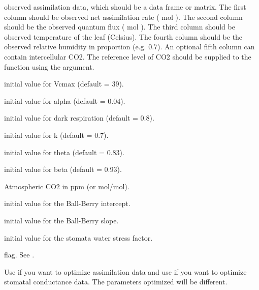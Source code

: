\documentclass[letterpaper]{book}
\begin{document}
%
\begin{Arguments}
\begin{ldescription}
\item[\code{data}] observed assimilation data, which should be a
data frame or matrix.  The first column should be
observed net assimilation rate (\eqn{\mu}{} mol
 ).  The second column should be
the observed quantum flux (\eqn{\mu}{} mol 
).  The third column should be observed
temperature of the leaf (Celsius).  The fourth column
should be the observed relative humidity in proportion
(e.g. 0.7). An optional fifth column can contain
intercellular CO2. The reference level of CO2 should be
supplied to the function using the  argument.

\item[\code{ivmax}] initial value for Vcmax (default = 39).

\item[\code{ialpha}] initial value for alpha (default = 0.04).

\item[\code{iRd}] initial value for dark respiration (default =
0.8).

\item[\code{ikparm}] initial value for k (default = 0.7).

\item[\code{itheta}] initial value for theta (default = 0.83).

\item[\code{ibeta}] initial value for beta (default = 0.93).

\item[\code{Catm}] Atmospheric CO2 in ppm (or
\eqn{\mu}{}mol/mol).

\item[\code{ib0}] initial value for the Ball-Berry intercept.

\item[\code{ib1}] initial value for the Ball-Berry slope.

\item[\code{iStomWS}] initial value for the stomata water stress
factor.

\item[\code{ws}]  flag. See .

\item[\code{response}] Use  if you want to
optimize assimilation data and use  if
you want to optimize stomatal conductance data. The
parameters optimized will be different.


\end{ldescription}
\end{Arguments}
\end{document}
